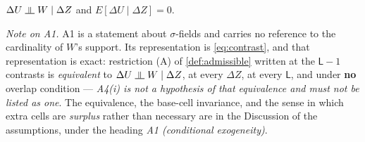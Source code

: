 %

\begin{assumption}\label{ass:condind}
$\Delta U \upmodels W \mid \Delta Z$ and $E[\Delta U \mid \Delta Z] = 0$.
\end{assumption}

\noindent\emph{Note on A1.} A1 is a statement about $\sigma$-fields and carries no reference to the
cardinality of $W$'s support. Its representation is \eqref{eq:contrast}, and that representation is
exact: restriction (A) of \cref{def:admissible} written at the $\mathsf L-1$ contrasts is
\emph{equivalent} to $\Delta U\upmodels W\mid\Delta Z$, at every $\Delta Z$, at every $\mathsf L$, and
under \textbf{no} overlap condition --- \emph{A4(i) is not a hypothesis of that equivalence and must not
be listed as one}. The equivalence, the base-cell invariance, and the sense in which extra cells are
\emph{surplus} rather than necessary are in the Discussion of the assumptions, under the heading
\emph{A1 (conditional exogeneity)}.

